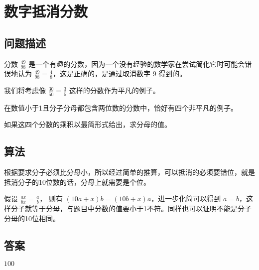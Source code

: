 \section{数字抵消分数}\label{sec:problem33}
\subsection{问题描述}
\begin{tcolorbox}
	分数 \( \frac{49}{98} \) 是一个有趣的分数，因为一个没有经验的数学家在尝试简化它时可能会错误地认为 \( \frac{49}{98} = \frac{4}{8} \)，这是正确的，是通过取消数字 9 得到的。

	我们将考虑像 \( \frac{30}{50} = \frac{3}{5} \) 这样的分数作为平凡的例子。

	在数值小于1且分子分母都包含两位数的分数中，恰好有四个非平凡的例子。

	如果这四个分数的乘积以最简形式给出，求分母的值。
\end{tcolorbox}

\subsection{算法}
根据要求分子必须比分母小，所以经过简单的推算，可以抵消的必须要错位，就是抵消分子的10位数的话，分母上就需要是个位。

假设 \( \frac{ax}{bx} = \frac{a}{b} \)， 则有 \(  (10a + x) b = (10b + x) a \)，进一步化简可以得到 \( a = b
\)，这样分子就等于分母，与题目中分数的值要小于1不符。同样也可以证明不能是分子分母的10位相同。

\subsection{答案}
\( 100 \)
